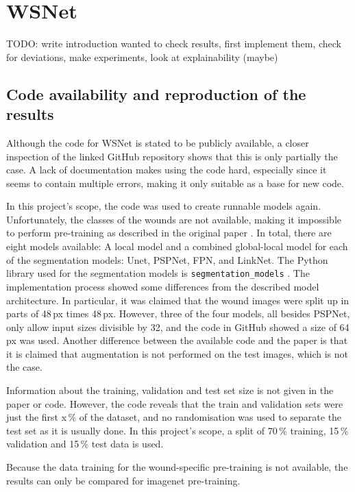 \section{WSNet}

TODO: write introduction
wanted to check results, first implement them, check for deviations, make experiments, look at explainability (maybe)

\subsection{Code availability and reproduction of the results}

Although the code for WSNet \cite{Oota_2023_WACV} is stated to be publicly available, a closer inspection of the linked GitHub repository shows that this is only partially the case. A lack of documentation makes using the code hard, especially since it seems to contain multiple errors, making it only suitable as a base for new code.

In this project's scope, the code was used to create runnable models again. Unfortunately, the classes of the wounds are not available, making it impossible to perform pre-training as described in the original paper \cite{Oota_2023_WACV}. In total, there are eight models available: A local model and a combined global-local model for each of the segmentation models: Unet, PSPNet, FPN, and LinkNet. The Python library used for the segmentation models is \texttt{segmentation\_models} \cite{SegmentationModels}. The implementation process showed some differences from the described model architecture. In particular, it was claimed that the wound images were split up in parts of 48\,px times 48\,px. However, three of the four models, all besides PSPNet, only allow input sizes divisible by 32, and the code in GitHub showed a size of 64\,px was used. Another difference between the available code and the paper is that it is claimed that augmentation is not performed on the test images, which is not the case.

Information about the training, validation and test set size is not given in the paper or code. However, the code reveals that the train and validation sets were just the first x\,\% of the dataset, and no randomisation was used to separate the test set as it is usually done. In this project's scope, a split of 70\,\% training, 15\,\% validation and 15\,\% test data is used.

Because the data training for the wound-specific pre-training is not available, the results can only be compared for imagenet pre-training.


